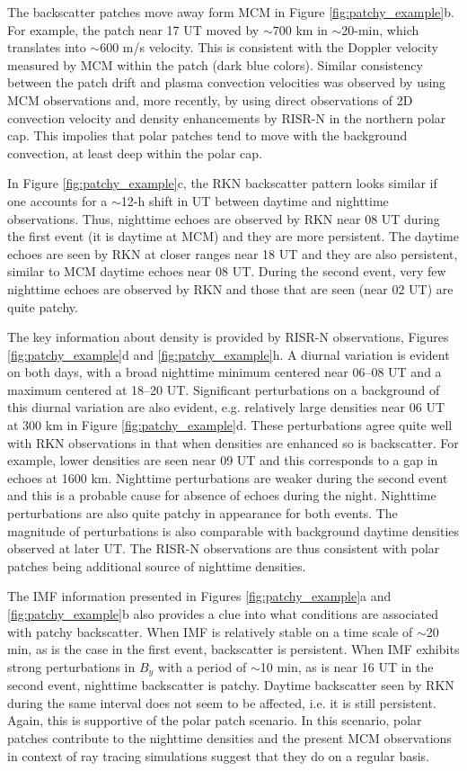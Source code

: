 The backscatter patches move away form MCM in Figure \ref{fig:patchy_example}b.  For example, the patch near 17 UT moved by \(\sim700\) km in \(\sim\)20-min, which translates into \(\sim600\) m/s velocity.  This is consistent with the Doppler velocity measured by MCM within the patch (dark blue colors).  Similar consistency between the patch drift and plasma convection velocities was observed by \citet{Bristow2011} using MCM observations and, more recently, by \citet{Makarevich2015} using direct observations of 2D convection velocity and density enhancements by RISR-N in the northern polar cap.  This impolies that polar patches tend to move with the background convection, at least deep within the polar cap.

In Figure \ref{fig:patchy_example}c, the RKN backscatter pattern looks similar if one accounts for a \(\sim\)12-h  shift in UT between daytime and nighttime observations. Thus, nighttime echoes are observed by RKN near 08 UT during the first event (it is daytime at MCM) and they are more persistent. The daytime echoes are seen by RKN at closer ranges near 18 UT and they are also persistent, similar to MCM daytime echoes near 08 UT. During the second event, very few nighttime echoes are observed by RKN and those that are seen (near 02 UT) are quite patchy.

The key information about density is provided by RISR-N observations, Figures \ref{fig:patchy_example}d and \ref{fig:patchy_example}h. A diurnal variation is evident on both days, with a broad nighttime minimum centered near 06--08 UT and a maximum centered at 18--20 UT. Significant perturbations on a background of this diurnal variation are also evident, e.g. relatively large densities near 06 UT at 300 km in Figure \ref{fig:patchy_example}d. These perturbations agree quite well with RKN observations in that when densities are enhanced so is backscatter. For example, lower densities are seen near 09 UT and this corresponds to a gap in echoes at 1600 km. Nighttime perturbations are weaker during the second event and this is a probable cause for absence of echoes during the night. Nighttime perturbations are also quite patchy in appearance for both events. The magnitude of perturbations is also comparable with background daytime densities observed at later UT. The RISR-N observations are thus consistent with polar patches being additional source of nighttime densities.

The IMF information presented in Figures \ref{fig:patchy_example}a and \ref{fig:patchy_example}b also provides a clue into what conditions are associated with patchy backscatter. When IMF is relatively stable on a time scale of \(\sim\)20 min, as is the case in the first event, backscatter is persistent. When IMF exhibits strong perturbations in \(B_y\) with a period of \(\sim\)10 min, as is near 16 UT in the second event, nighttime backscatter is patchy. Daytime backscatter seen by RKN during the same interval does not seem to be affected, i.e. it is still persistent. Again, this is supportive of the polar patch scenario.  In this scenario, polar patches contribute to the nighttime densities and the present MCM observations in context of ray tracing simulations suggest that they do on a regular basis.



